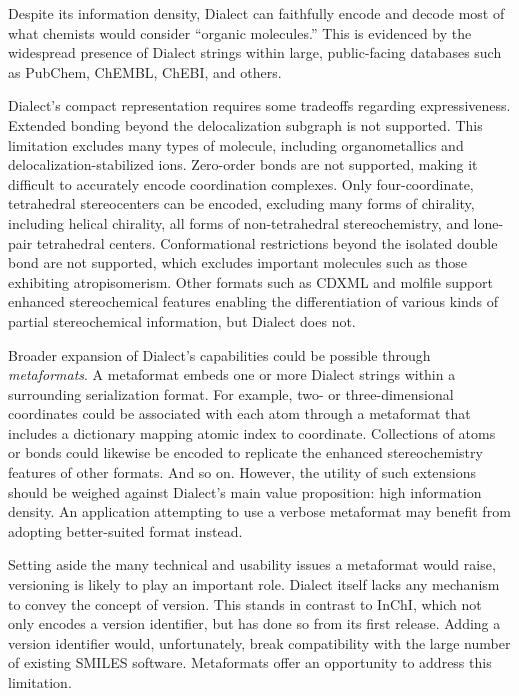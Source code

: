 \documentclass{article}
\begin{document}
Despite its information density, Dialect can faithfully encode and decode most of what chemists would consider \enquote{organic molecules.} This is evidenced by the widespread presence of Dialect strings within large, public-facing databases such as PubChem,\cite{kim:2016} ChEMBL,\cite{gaulton:2012} ChEBI,\cite{degtyarenko:2007} and others.

Dialect's compact representation requires some tradeoffs regarding expressiveness. Extended bonding beyond the delocalization subgraph is not supported. This limitation excludes many types of molecule, including organometallics and delocalization-\-stabilized ions. Zero-\-order bonds are not supported, making it difficult to accurately encode coordination complexes. Only four-\-coordinate, tetrahedral stereocenters can be encoded, excluding many forms of chirality, including helical chirality, all forms of non-\-tetrahedral stereochemistry, and lone-\-pair tetrahedral centers. Conformational restrictions beyond the isolated double bond are not supported, which excludes important molecules such as those exhibiting atropisomerism. Other formats such as CDXML and molfile support enhanced stereochemical features enabling the differentiation of various kinds of partial stereochemical information, but Dialect does not.

Broader expansion of Dialect's capabilities could be possible through \textit{metaformats}. A metaformat embeds one or more Dialect strings within a surrounding serialization format. For example, two- or three-dimensional coordinates could be associated with each atom through a metaformat that includes a dictionary mapping atomic index to coordinate. Collections of atoms or bonds could likewise be encoded to replicate the enhanced stereochemistry features of other formats. And so on. However, the utility of such extensions should be weighed against Dialect's main value proposition: high information density. An application attempting to use a verbose metaformat may benefit from adopting better-suited format instead.

Setting aside the many technical and usability issues a metaformat would raise, versioning is likely to play an important role. Dialect itself lacks any mechanism to convey the concept of version. This stands in contrast to InChI, which not only encodes a version identifier, but has done so from its first release. Adding a version identifier would, unfortunately, break compatibility with the large number of existing SMILES software. Metaformats offer an opportunity to address this limitation.
\end{document}

